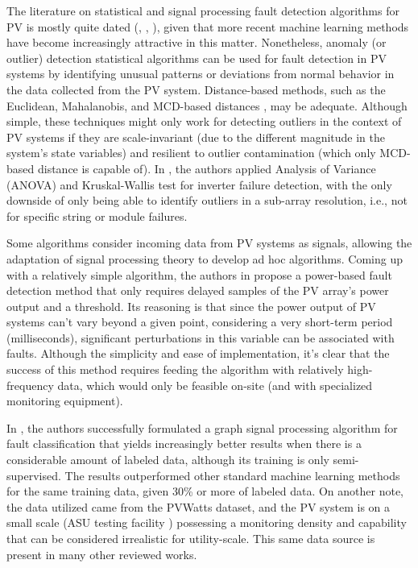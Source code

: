 The literature on statistical and signal processing fault detection algorithms for PV is mostly quite dated (\cite{Buddha2012}, \cite{Zhao2014}, \cite{Vergura2008}), given that more recent machine learning methods have become increasingly attractive in this matter. Nonetheless, anomaly (or outlier) detection statistical algorithms can be used for fault detection in PV systems by identifying unusual patterns or deviations from normal behavior in the data collected from the PV system. Distance-based methods, such as the Euclidean, Mahalanobis, and MCD-based distances \cite{Braun2011}, may be adequate. Although simple, these techniques might only work for detecting outliers in the context of PV systems if they are scale-invariant (due to the different magnitude in the system's state variables) and resilient to outlier contamination (which only MCD-based distance is capable of). In \cite{Vergura2008}, the authors applied Analysis of Variance (ANOVA) and Kruskal-Wallis test for inverter failure detection, with the only downside of only being able to identify outliers in a sub-array resolution, i.e., not for specific string or module failures.

Some algorithms consider incoming data from PV systems as signals, allowing the adaptation of signal processing theory to develop ad hoc algorithms. Coming up with a relatively simple algorithm, the authors in \cite{Iles2021} propose a power-based fault detection method that only requires delayed samples of the PV array's power output and a threshold. Its reasoning is that since the power output of PV systems can't vary beyond a given point, considering a very short-term period (milliseconds), significant perturbations in this variable can be associated with faults. Although the simplicity and ease of implementation, it's clear that the success of this method requires feeding the algorithm with relatively high-frequency data, which would only be feasible on-site (and with specialized monitoring equipment).

In \cite{Fan2020}, the authors successfully formulated a graph signal processing algorithm for fault classification that yields increasingly better results when there is a considerable amount of labeled data, although its training is only semi-supervised. The results outperformed other standard machine learning methods for the same training data, given 30\% or more of labeled data. On another note, the data utilized came from the PVWatts \cite{Dobos2013} dataset, and the PV system is on a small scale (ASU testing facility \cite{Rao2016}) possessing a monitoring density and capability that can be considered irrealistic for utility-scale. This same data source is present in many other reviewed works.

